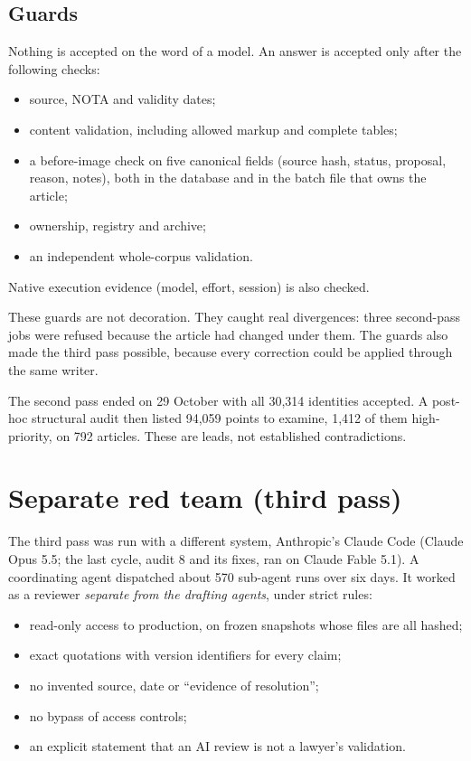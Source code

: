 \documentclass[11pt,a4paper]{article}
\begin{document}
\subsection{Guards}

Nothing is accepted on the word of a model. An answer is accepted only after the following checks:
\begin{itemize}
  \item source, NOTA and validity dates;
  \item content validation, including allowed markup and complete tables;
  \item a before-image check on five canonical fields (source hash, status, proposal, reason, notes), both in the database and in the batch file that owns the article;
  \item ownership, registry and archive;
  \item an independent whole-corpus validation.
\end{itemize}
Native execution evidence (model, effort, session) is also checked.

These guards are not decoration. They caught real divergences: three second-pass jobs were refused because the article had changed under them. The guards also made the third pass possible, because every correction could be applied through the same writer.

The second pass ended on 29 October with all 30{,}314 identities accepted. A post-hoc structural audit then listed 94{,}059 points to examine, 1{,}412 of them high-priority, on 792 articles. These are leads, not established contradictions.

\section{Separate red team (third pass)}
\label{sec:redteam}

The third pass was run with a different system, Anthropic's Claude Code (Claude Opus 5.5; the last cycle, audit 8 and its fixes, ran on Claude Fable 5.1). A coordinating agent dispatched about 570 sub-agent runs over six days. It worked as a reviewer \emph{separate from the drafting agents}, under strict rules:
\begin{itemize}
  \item read-only access to production, on frozen snapshots whose files are all hashed;
  \item exact quotations with version identifiers for every claim;
  \item no invented source, date or ``evidence of resolution'';
  \item no bypass of access controls;
  \item an explicit statement that an AI review is not a lawyer's validation.
\end{itemize}
\end{document}
